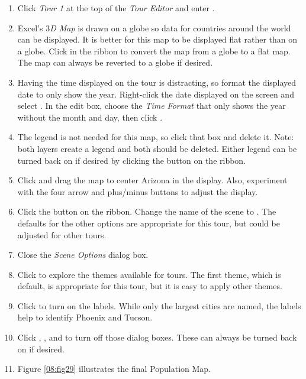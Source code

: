 \begin{enumerate}[resume]
	\item Click \textit{Tour 1} at the top of the \textit{Tour Editor} and enter . 
	\item Excel's \textit{$ 3 $D Map} is drawn on a globe so data for countries around the world can be displayed. It is better for this map to be displayed flat rather than on a globe. Click  in the ribbon to convert the map from a globe to a flat map. The map can always be reverted to a globe if desired.
	\item Having the time displayed on the tour is distracting, so format the displayed date to only show the year. Right-click the date displayed on the screen and select . In the edit box, choose the \textit{Time Format} that only shows the year without the month and day, then click .
	\item The legend is not needed for this map, so click that box and delete it. Note: both layers create a legend and both should be deleted. Either legend can be turned back on if desired by clicking the  button on the ribbon.
	\item Click and drag the map to center Arizona in the display. Also, experiment with the four arrow and plus/minus buttons to adjust the display.
	\item Click the  button on the ribbon. Change the name of the scene to . The defaults for the other options are appropriate for this tour, but could be adjusted for other tours.
	\item Close the \textit{Scene Options} dialog box.
	\item Click  to explore the themes available for tours. The first theme, which is default, is appropriate for this tour, but it is easy to apply other themes.
	\item Click  to turn on the labels. While only the largest cities are named, the labels help to identify Phoenix and Tucson.
	\item Click , , and to turn off those dialog boxes. These can always be turned back on if desired.
	\item Figure \ref{08:fig29} illustrates the final Population Map.
\end{enumerate}

